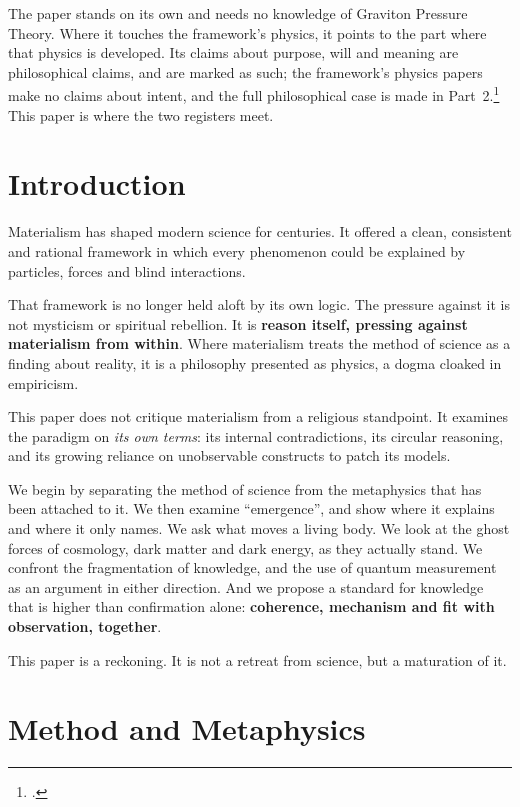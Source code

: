 \documentclass[11pt,a4paper]{article}
\newcommand{\fn}[1]{\footnote{\citealp{#1}.}}
\begin{document}
The paper stands on its own and needs no knowledge of Graviton Pressure Theory. Where it touches the framework's physics, it points to the part where that physics is developed. Its claims about purpose, will and meaning are philosophical claims, and are marked as such; the framework's physics papers make no claims about intent, and the full philosophical case is made in Part~2.\fn{rashadaPart2} This paper is where the two registers meet.

\statuskey

\section*{Introduction}

Materialism has shaped modern science for centuries. It offered a clean, consistent and rational framework in which every phenomenon could be explained by particles, forces and blind interactions.

That framework is no longer held aloft by its own logic. The pressure against it is not mysticism or spiritual rebellion. It is \textbf{reason itself, pressing against materialism from within}. Where materialism treats the method of science as a finding about reality, it is a philosophy presented as physics, a dogma cloaked in empiricism.

This paper does not critique materialism from a religious standpoint. It examines the paradigm on \textit{its own terms}: its internal contradictions, its circular reasoning, and its growing reliance on unobservable constructs to patch its models.

We begin by separating the method of science from the metaphysics that has been attached to it. We then examine ``emergence'', and show where it explains and where it only names. We ask what moves a living body. We look at the ghost forces of cosmology, dark matter and dark energy, as they actually stand. We confront the fragmentation of knowledge, and the use of quantum measurement as an argument in either direction. And we propose a standard for knowledge that is higher than confirmation alone: \textbf{coherence, mechanism and fit with observation, together}.

This paper is a reckoning. It is not a retreat from science, but a maturation of it.

\section{Method and Metaphysics}
\label{sec:method}
\end{document}
